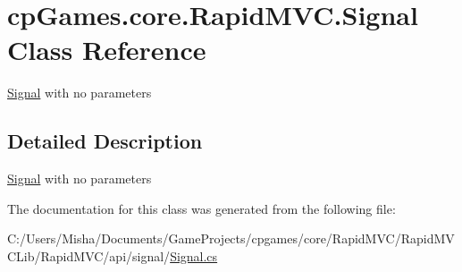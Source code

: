 \hypertarget{classcp_games_1_1core_1_1_rapid_m_v_c_1_1_signal}{}\section{cp\+Games.\+core.\+Rapid\+M\+V\+C.\+Signal Class Reference}
\label{classcp_games_1_1core_1_1_rapid_m_v_c_1_1_signal}


\mbox{\hyperlink{classcp_games_1_1core_1_1_rapid_m_v_c_1_1_signal}{Signal}} with no parameters  




\subsection{Detailed Description}
\mbox{\hyperlink{classcp_games_1_1core_1_1_rapid_m_v_c_1_1_signal}{Signal}} with no parameters 



The documentation for this class was generated from the following file\+:\begin{DoxyCompactItemize}
\item 
C\+:/\+Users/\+Misha/\+Documents/\+Game\+Projects/cpgames/core/\+Rapid\+M\+V\+C/\+Rapid\+M\+V\+C\+Lib/\+Rapid\+M\+V\+C/api/signal/\mbox{\hyperlink{_signal_8cs}{Signal.\+cs}}\end{DoxyCompactItemize}
